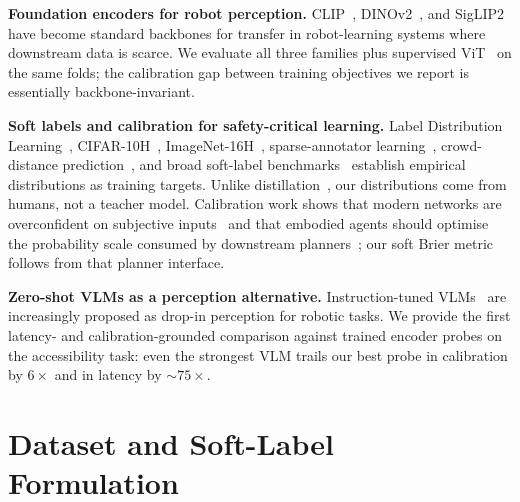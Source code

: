 \documentclass{article}
\begin{document}
\textbf{Foundation encoders for robot perception.} CLIP~\citep{radford2021learningtransferablevisualmodels}, DINOv2~\citep{oquab2023dinov2}, and SigLIP2~\citep{tschannen2025siglip2} have become standard backbones for transfer in robot-learning systems where downstream data is scarce. We evaluate all three families plus supervised ViT~\citep{dosovitskiy2021an} on the same folds; the calibration gap between training objectives we report is essentially backbone-invariant.

\textbf{Soft labels and calibration for safety-critical learning.} Label Distribution Learning~\citep{geng2016label}, CIFAR-10H~\citep{peterson2019humanuncertainty}, ImageNet-16H~\citep{steyvers2022bayesian}, sparse-annotator learning~\citep{collins2022elicit}, crowd-distance prediction~\citep{jiang2024crowdcalibrator}, and broad soft-label benchmarks~\citep{xia2025softlabels} establish empirical distributions as training targets. Unlike distillation~\citep{hinton2015distilling}, our distributions come from humans, not a teacher model. Calibration work shows that modern networks are overconfident on subjective inputs~\citep{guo2017calibration,minderer2021revisiting} and that embodied agents should optimise the probability scale consumed by downstream planners~\citep{zollo2025calibration}; our soft Brier metric follows from that planner interface.

\textbf{Zero-shot VLMs as a perception alternative.} Instruction-tuned VLMs~\citep{liu2023llava,bai2023qwenvl,10.5555/3618408.3619222,chen2024internvl} are increasingly proposed as drop-in perception for robotic tasks. We provide the first latency- and calibration-grounded comparison against trained encoder probes on the accessibility task: even the strongest VLM trails our best probe in calibration by $6\times$ and in latency by $\sim 75\times$.

\section{Dataset and Soft-Label Formulation}
\label{sec:dataset}
\end{document}
